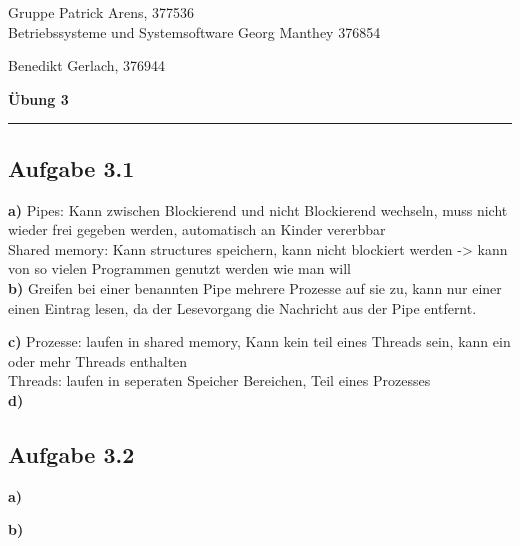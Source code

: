 \documentclass[a4paper,graphics,11pt]{article}
\newcommand{\aufgabe}[1]{\subsection*{Aufgabe #1}}
\begin{document}
\noindent Gruppe              \hfill Patrick Arens, 377536\\
\noindent Betriebssysteme und Systemsoftware    \hfill Georg Manthey 376854\\
\strut\hfill Benedikt Gerlach, 376944\\
\begin{center}
	\LARGE{\textbf{Übung 3}}
\end{center}
\begin{center}
\rule[0.1ex]{\textwidth}{1pt}
\end{center}

\aufgabe{3.1}

\textbf{a)}
Pipes: Kann zwischen Blockierend und nicht Blockierend wechseln, muss nicht wieder frei gegeben werden, automatisch an Kinder vererbbar
\\
Shared memory: Kann structures speichern, kann nicht blockiert werden -> kann von so vielen Programmen genutzt werden wie man will\\

\textbf{b)}
Greifen bei einer benannten Pipe mehrere Prozesse auf sie zu, kann nur einer einen Eintrag lesen, da der Lesevorgang die Nachricht aus der Pipe entfernt.

\textbf{c)}
Prozesse: laufen in shared memory, Kann kein teil eines Threads sein, kann ein oder mehr Threads enthalten\\
Threads: laufen in seperaten Speicher Bereichen, Teil eines Prozesses \\

\textbf{d)}

\aufgabe{3.2}

\textbf{a)}

\textbf{b)}
\end{document}
